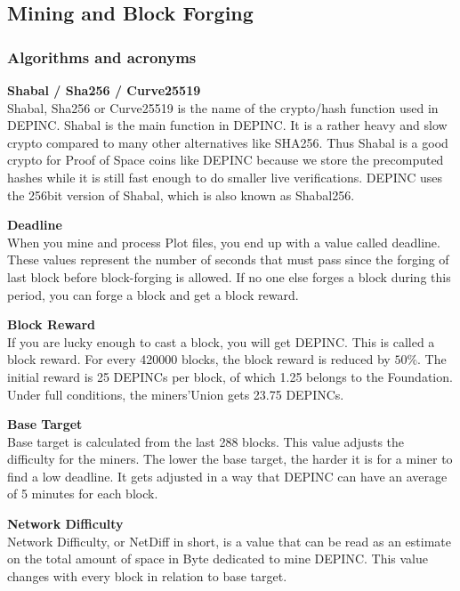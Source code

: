 \subsection{Mining and Block Forging}
\subsubsection{Algorithms and acronyms}
\begin{flushleft}
    \textbf{Shabal / Sha256 / Curve25519}\\
    Shabal, Sha256 or Curve25519 is the name of the crypto/hash function used in DEPINC. Shabal is the main function in DEPINC. It is a rather heavy and slow crypto compared to many other alternatives like SHA256. Thus Shabal is a good crypto for Proof of Space coins like DEPINC because we store the precomputed hashes while it is still fast enough to do smaller live verifications. DEPINC uses the 256bit version of Shabal, which is also known as Shabal256.
\end{flushleft}
\begin{flushleft}
    \textbf{Deadline}\\
    When you mine and process Plot files, you end up with a value called deadline. These values represent the number of seconds that must pass since the forging of last block before block-forging is allowed. If no one else forges a block during this period, you can forge a block and get a block reward.
\end{flushleft}
\begin{flushleft}
    \textbf{Block Reward}\\
    If you are lucky enough to cast a block, you will get DEPINC. This is called a block reward. For every 420000 blocks, the block reward is reduced by $50\%$. The initial reward is 25 DEPINCs per block, of which 1.25 belongs to the Foundation. Under full conditions, the miners'Union gets 23.75 DEPINCs.
\end{flushleft}
\begin{flushleft}
    \textbf{Base Target}\\
    Base target is calculated from the last 288 blocks. This value adjusts the difficulty for the miners. The lower the base target, the harder it is for a miner to find a low deadline. It gets adjusted in a way that DEPINC can have an average of 5 minutes for each block.
\end{flushleft}
\begin{flushleft}
    \textbf{Network Difficulty}\\
    Network Difficulty, or NetDiff in short, is a value that can be read as an estimate on the total amount of space in Byte dedicated to mine DEPINC. This value changes with every block in relation to base target.
\end{flushleft}
